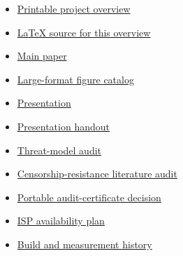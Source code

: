 \documentclass[12pt,a4paper]{article}
\begin{document}
\begin{itemize}
\item \href{PROJECT-OVERVIEW.pdf}{Printable project overview}


\item \href{PROJECT-OVERVIEW.tex}{LaTeX source for this overview}


\item \href{paper/main.pdf}{Main paper}


\item \href{paper/figures-draft.pdf}{Large-format figure catalog}


\item \href{paper/Islands-of-Reach-Presentation.pptx}{Presentation}


\item \href{paper/Islands-of-Reach-Presentation.pdf}{Presentation handout}


\item \href{Code\%20Implementation/NSYSS-2026-THREAT-MODEL-AUDIT.md}{Threat-model audit}


\item \href{Code\%20Implementation/NSYSS-2026-CENSORSHIP-RESISTANCE-SOURCES.md}{Censorship-resistance literature audit}


\item \href{Code\%20Implementation/ADR-009-PORTABLE-AUDIT-CERTIFICATES.md}{Portable audit-certificate decision}


\item \href{Code\%20Implementation/P3-ISP-AVAILABILITY-PLAN.md}{ISP availability plan}


\item \href{Code\%20Implementation/BUILD-LOG.md}{Build and measurement history}


\end{itemize}
\end{document}
